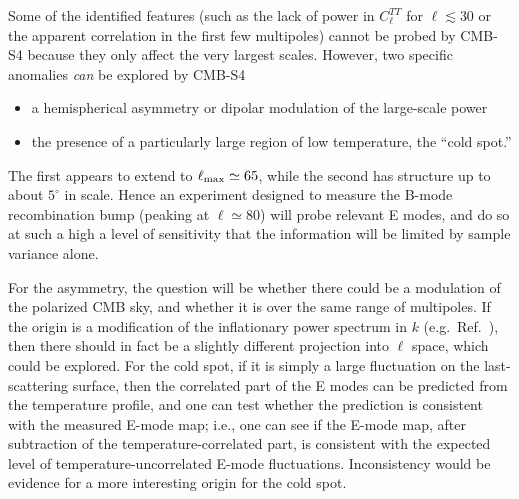 Some of the identified features (such as the lack of power in $C_\ell^{TT}$
for $\ell\lesssim30$ or the apparent correlation in the first few multipoles)
cannot be probed by CMB-S4 because they only affect the very largest scales.
However, two specific anomalies {\it can\/} be explored by CMB-S4

\begin{itemize}
  \item a hemispherical asymmetry or dipolar modulation of the large-scale
  power
  \item the presence of a particularly large region of low temperature,
  the ``cold spot.''
\end{itemize}

The first appears to extend to $\ell_{\rm max}\simeq65$, while the second has
structure up to about $5^\circ$ in scale.  Hence an experiment designed to
measure the B-mode recombination bump (peaking at $\ell\simeq80$)
will probe relevant E modes, and do so
at such a high a level of sensitivity that the information will be limited
by sample variance alone.

For the asymmetry, the question will be whether there could be a modulation
of the polarized CMB sky, and whether it is over the same range of
multipoles.  If the origin is a modification of the inflationary power
spectrum in $k$ (e.g.\ Ref.~\cite{Gordon:2005ai}),
then there should in fact be a slightly different projection
into $\ell$ space, which could be explored.
For the cold spot, if it is simply a large fluctuation
on the last-scattering surface, then the correlated part of the E modes can
be predicted from the temperature profile, and one can test whether the prediction
is consistent with the measured E-mode map; i.e., one can see if the E-mode map, after subtraction
of the temperature-correlated part, is consistent with the expected level of temperature-uncorrelated E-mode fluctuations. Inconsistency would be evidence for a more interesting origin for the cold spot.


